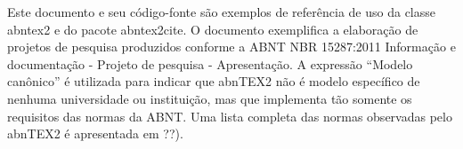 



Este documento e seu código-fonte são exemplos de referência de uso da classe
abntex2 e do pacote abntex2cite. O documento exemplifica a elaboração de projetos de
pesquisa produzidos conforme a ABNT NBR 15287:2011 Informação e documentação -
Projeto de pesquisa - Apresentação.
A expressão “Modelo canônico” é utilizada para indicar que abnTEX2 não é modelo
específico de nenhuma universidade ou instituição, mas que implementa tão somente os
requisitos das normas da ABNT. Uma lista completa das normas observadas pelo abnTEX2
é apresentada em ??).

